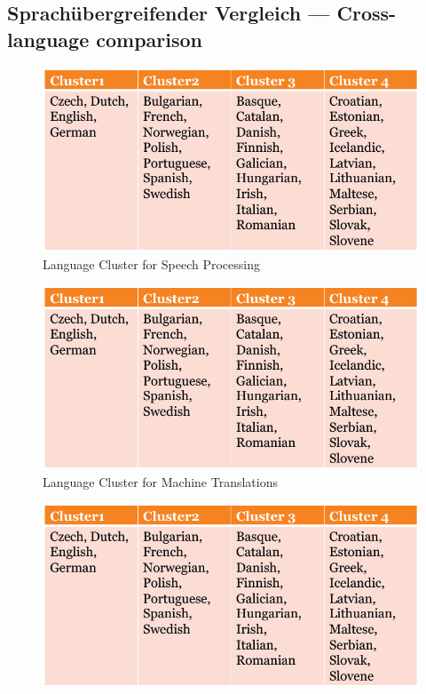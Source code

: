 \documentclass[]{../../metanetpaper}
\begin{document}
\begin{Parallel}[c]{80mm}{80mm}
  \subsection{Sprachübergreifender Vergleich --- Cross-language comparison}
\begin{figure}[h!]
\center
\includegraphics[scale=0.4]{../_media/bild}\\
\textsf{Language Cluster for Speech Processing}
 \end{figure}
\begin{figure}[h!]
\center
\includegraphics[scale=0.4]{../_media/bild}\\
\textsf{Language Cluster for Machine Translations}
 \end{figure}\begin{figure}[h!]
\center
\includegraphics[scale=0.4]{../_media/bild}\\

\end{figure}
\end{Parallel}
\end{document}
